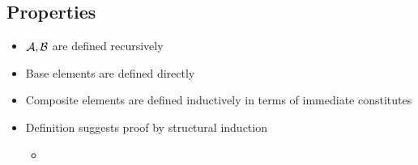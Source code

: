 \subsection{Properties}
\begin{itemize}
    \item $\mathcal{A, B}$ are defined recursively
    \item Base elements are defined directly
    \item Composite elements are defined inductively in terms of immediate constitutes
    \item Definition suggests proof by structural induction
        \begin{itemize}
            \item
        \end{itemize}
\end{itemize}

